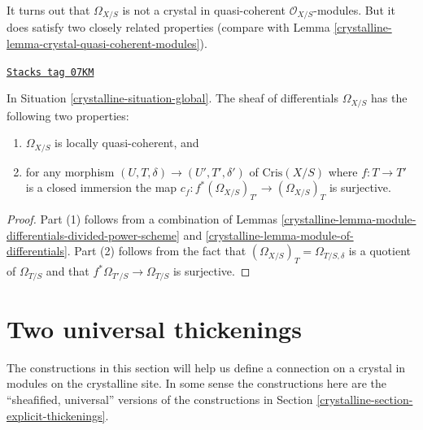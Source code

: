 It turns out that $\Omega_{X/S}$ is not a crystal in quasi-coherent
$\mathcal{O}_{X/S}$-modules. But it does satisfy two closely
related properties (compare with
Lemma \ref{crystalline-lemma-crystal-quasi-coherent-modules}).

\begin{lemma}
\label{crystalline-lemma-omega-locally-quasi-coherent}
\href{https://stacks.math.columbia.edu/tag/07KM}{\texttt{Stacks tag 07KM}}

In Situation \ref{crystalline-situation-global}.
The sheaf of differentials $\Omega_{X/S}$ has the following two
properties:
\begin{enumerate}
\item $\Omega_{X/S}$ is locally quasi-coherent, and
\item for any morphism $(U, T, \delta) \to (U', T', \delta')$
of $\text{Cris}(X/S)$ where $f : T \to T'$ is a closed immersion
the map $c_f : f^*(\Omega_{X/S})_{T'} \to (\Omega_{X/S})_T$ is surjective.
\end{enumerate}
\end{lemma}

\begin{proof}

Part (1) follows from a combination of
Lemmas \ref{crystalline-lemma-module-differentials-divided-power-scheme} and
\ref{crystalline-lemma-module-of-differentials}.
Part (2) follows from the fact that
$(\Omega_{X/S})_T = \Omega_{T/S, \delta}$
is a quotient of $\Omega_{T/S}$ and that $f^*\Omega_{T'/S} \to \Omega_{T/S}$
is surjective.
\end{proof}

\section{Two universal thickenings}
\label{crystalline-section-universal-thickenings}
The constructions in this section will help us define a connection on
a crystal in modules on the crystalline site. In some sense the constructions
here are the ``sheafified, universal'' versions of the constructions in
Section \ref{crystalline-section-explicit-thickenings}.

